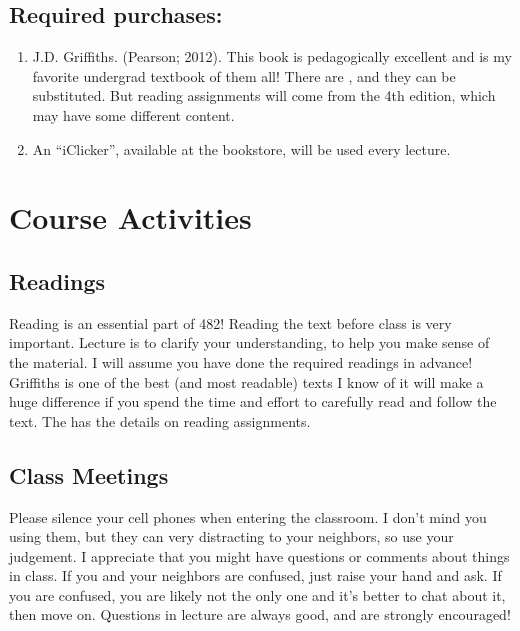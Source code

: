 \documentclass[letterpaper,10pt,english]{jupyterBook}
\begin{document}
\subsection{Required purchases:}
\label{\detokenize{content/0_course/design:required-purchases}}\begin{enumerate}
%
\item {} 
\sphinxAtStartPar
J.D. Griffiths.  (Pearson; 2012). This book is
pedagogically excellent and is my favorite undergrad textbook of
them all! There are , and they can be substituted. But
reading assignments will come from the 4th edition, which may have
some different content.

\item {} 
\sphinxAtStartPar
An “iClicker”, available at the bookstore, will be used
every lecture.

\end{enumerate}


\section{Course Activities}
\label{\detokenize{content/0_course/design:course-activities}}

\subsection{Readings}
\label{\detokenize{content/0_course/design:readings}}
\sphinxAtStartPar
Reading is an essential part of 482! Reading the text before class is
very important. Lecture is to clarify your understanding, to help you
make sense of the material. I will assume you have done the required
readings in advance! Griffiths is one of the best (and most readable)
texts I know of \sphinxhyphen{} it will make a huge difference if you spend the time
and effort to carefully read and follow the text. The
 has the details on reading assignments.


\subsection{Class Meetings}
\label{\detokenize{content/0_course/design:class-meetings}}
\sphinxAtStartPar
{} Please silence your cell phones when entering the classroom.
I don’t mind you using them, but they can very distracting to your neighbors, so
use your judgement. I appreciate that you might have questions or comments about things in
class. If you and your neighbors are confused, just raise your hand and ask. If you are confused, you are likely not the only one and it’s better to chat about it, then move on.
Questions in lecture are always good, and are strongly encouraged!
\end{document}

